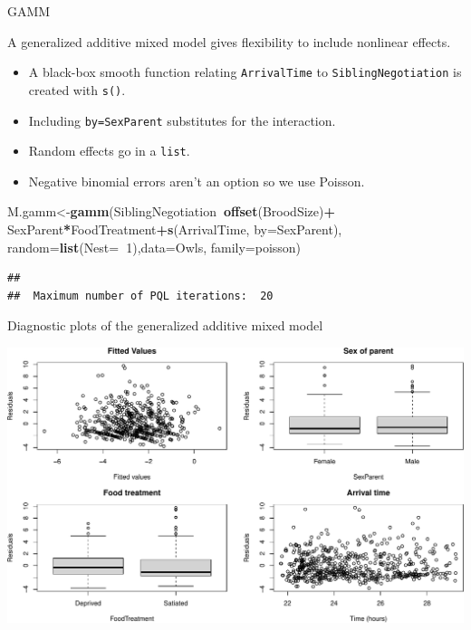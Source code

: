 \documentclass[
  ignorenonframetext,
]{beamer}
\newenvironment{Shaded}{\begin{snugshade}}{\end{snugshade}}
\newcommand{\DataTypeTok}[1]{\textcolor[rgb]{0.13,0.29,0.53}{#1}}
\newcommand{\DecValTok}[1]{\textcolor[rgb]{0.00,0.00,0.81}{#1}}
\newcommand{\KeywordTok}[1]{\textcolor[rgb]{0.13,0.29,0.53}{\textbf{#1}}}
\newcommand{\NormalTok}[1]{#1}
\newcommand{\OperatorTok}[1]{\textcolor[rgb]{0.81,0.36,0.00}{\textbf{#1}}}
\newcommand{\StringTok}[1]{\textcolor[rgb]{0.31,0.60,0.02}{#1}}
\providecommand{\tightlist}{%
  \setlength{\itemsep}{0pt}\setlength{\parskip}{0pt}}
\begin{document}
\begin{frame}[fragile]{GAMM}
\protect\hypertarget{gamm}{}

A generalized additive mixed model gives flexibility to include
nonlinear effects.

\begin{itemize}
\tightlist
\item
  A black-box smooth function relating \texttt{ArrivalTime} to
  \texttt{SiblingNegotiation} is created with \texttt{s()}.
\item
  Including \texttt{by=SexParent} substitutes for the interaction.
\item
  Random effects go in a \texttt{list}.
\item
  Negative binomial errors aren't an option so we use Poisson.
\end{itemize}

\scriptsize

\begin{Shaded}
\begin{Highlighting}[]
\NormalTok{M.gamm<-}\KeywordTok{gamm}\NormalTok{(SiblingNegotiation}\OperatorTok{~}\KeywordTok{offset}\NormalTok{(BroodSize)}\OperatorTok{+}
\StringTok{                }\NormalTok{SexParent}\OperatorTok{*}\NormalTok{FoodTreatment}\OperatorTok{+}\KeywordTok{s}\NormalTok{(ArrivalTime, }\DataTypeTok{by=}\NormalTok{SexParent),}
              \DataTypeTok{random=}\KeywordTok{list}\NormalTok{(}\DataTypeTok{Nest=}\OperatorTok{~}\DecValTok{1}\NormalTok{),}\DataTypeTok{data=}\NormalTok{Owls,}
              \DataTypeTok{family=}\NormalTok{poisson)}
\end{Highlighting}
\end{Shaded}

\begin{verbatim}
## 
##  Maximum number of PQL iterations:  20
\end{verbatim}

\end{frame}

\begin{frame}{Diagnostic plots of the generalized additive mixed model}
\protect\hypertarget{diagnostic-plots-of-the-generalized-additive-mixed-model}{}

\scriptsize

\includegraphics{mixed_models_files/figure-beamer/unnamed-chunk-26-1.pdf}

\end{frame}
\end{document}
